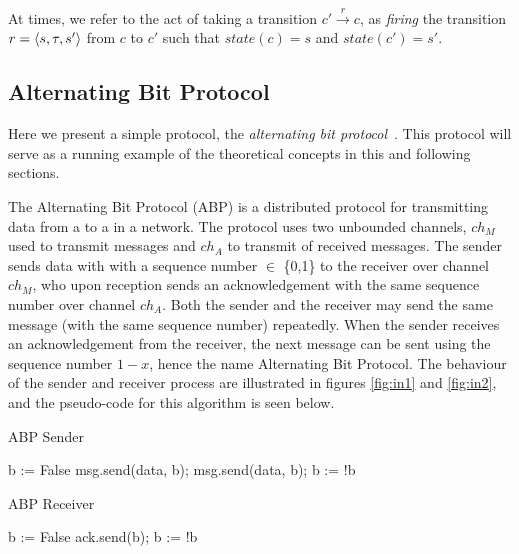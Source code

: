 At times, we refer to the act of taking a transition $c' \xrightarrow{r} c$, as \emph{firing} the transition $r=\langle s,\tau,s'\rangle$ from $c$ to $c'$ such that $state(c)=s$ and $state(c')=s'$.

\subsection{Alternating Bit Protocol}
Here we present a simple protocol, the \emph{alternating bit protocol}~\cite{bartlett1969note}. This protocol will serve as a running example of the theoretical concepts in this and following sections.

The Alternating Bit Protocol (ABP)\cite{foldoc} is a distributed protocol for transmitting data from a  to a  in a network. The protocol uses two unbounded channels, $ch_M$ used to transmit messages and $ch_A$ to transmit  of received messages. The sender sends data with with a sequence number  $\in$ \{0,1\} to the receiver over channel $ch_M$, who upon reception sends an acknowledgement with the same sequence number over channel $ch_A$. Both the sender and the receiver may send the same message (with the same sequence number) repeatedly. When the sender receives an acknowledgement from the receiver, the next message can be sent using the sequence number $1-x$, hence the name Alternating Bit Protocol. The behaviour of the sender and receiver process are illustrated in figures \ref{fig:in1} and \ref{fig:in2}, and the pseudo-code for this algorithm is seen below.

\begin{algorithm}
  \caption{ABP Sender}
  \label{senderpseudo}
\begin{algorithmic}[1]
    \State b := False 
      \State msg.send(data, b); 
       
      \State msg.send(data, b); 
      \EndWhile
      \State b := !b 
    \EndFor
\end{algorithmic}
\end{algorithm}


\begin{algorithm}
  \caption{ABP Receiver}
  \label{senderpseudo}
\begin{algorithmic}[1]
    \State b := False 
       
      \State ack.send(b); 
      \EndWhile
      \State b := !b 
    \EndFor
\end{algorithmic}
\end{algorithm}

